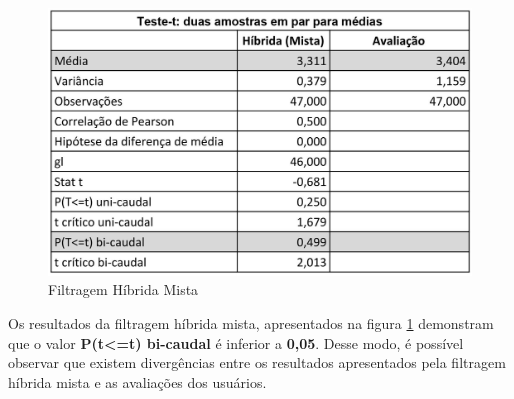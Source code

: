 \begin{figure}[H]
	\centering
	\includegraphics[width=.7\linewidth]{imagens/testeTMisto.jpg}
	\caption[Teste T: Filtragem Híbrida Mista]{Filtragem Híbrida Mista}
    \label{fig:testeTMisto}
\end{figure}

Os resultados da filtragem híbrida mista, apresentados na figura \ref{fig:testeTMisto} demonstram que o valor \textbf{P(t<=t) bi-caudal} é inferior a \textbf{0,05}. Desse modo, é possível observar que existem divergências entre os resultados apresentados pela filtragem híbrida mista e as avaliações dos usuários.